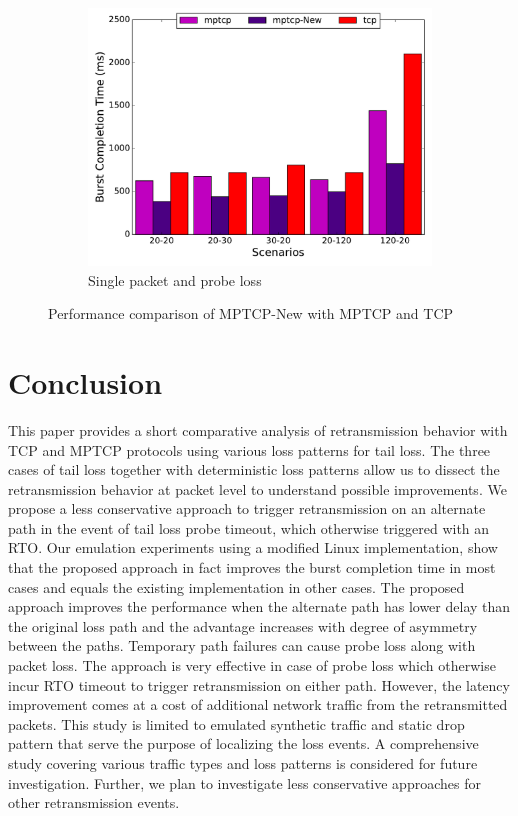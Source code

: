 \documentclass[10pt,conference,compsoc]{IEEEtran}
\begin{document}
\begin{figure}[!tbp]
\begin{subfigure}[b]{0.32\textwidth}
\includegraphics[angle=0, width=\textwidth, natwidth=578.16,natheight=433.62]{plots/1PPNew.pdf}
\caption{Single packet and probe loss}\label{1ppn}
\end{subfigure}
\caption{Performance comparison of MPTCP-New with MPTCP and TCP}\label{mpnew}
\end{figure}


\section{Conclusion}\label{conc}
This paper provides a short comparative analysis of retransmission behavior with TCP and MPTCP protocols using various loss patterns for tail loss.
The three cases of tail loss together with deterministic loss patterns allow us to dissect the retransmission behavior at packet level to understand possible improvements.
We propose a less conservative approach to trigger retransmission on an alternate path in the event of tail loss probe timeout, which otherwise triggered with an RTO. 
Our emulation experiments  using a modified Linux implementation, show that the proposed approach in fact improves the burst completion time in most cases and equals the existing
implementation in other cases. The proposed approach improves the performance when the alternate path has lower delay than the original loss path and the advantage increases with degree of asymmetry between the paths. Temporary path failures can cause probe loss along with packet loss. The approach is very effective in case of probe loss which otherwise incur RTO timeout to trigger retransmission on either path. However, the latency improvement comes at a cost of additional network traffic from the retransmitted packets. This study is limited to emulated synthetic traffic and static drop pattern that serve the purpose of localizing the loss events. A comprehensive study covering various traffic types and loss patterns is considered for future investigation. Further, we plan to investigate less conservative approaches for other retransmission events.
   


\end{document}
